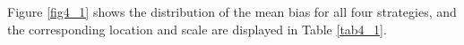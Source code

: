	Figure \ref{fig4_1} shows the distribution of the mean bias for all four strategies, and the corresponding location and scale are displayed in Table \ref{tab4_1}.  
	\begin{figure}[ht!]
		\begin{center}
			\\ 	
			\resizebox{\textwidth}{!}{
				\subfigure[BLI-SPC $\rho_{partial} = 0.99$]{
}}
\end{center}
\end{figure}
